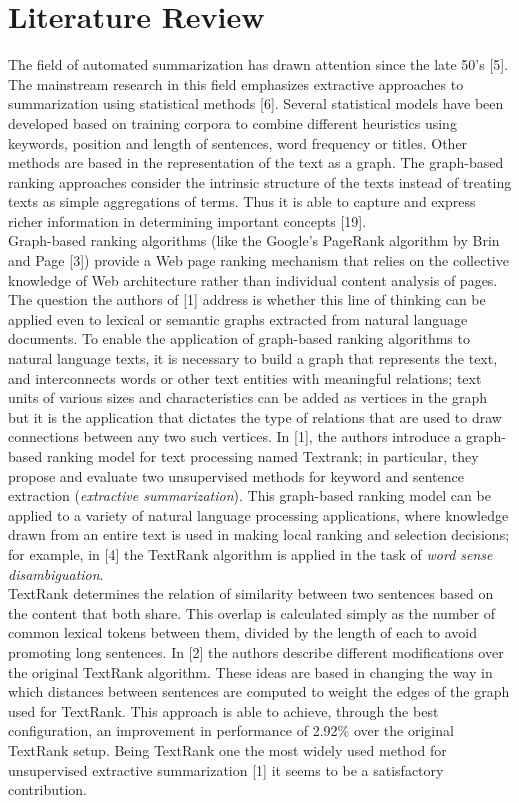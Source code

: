 \documentclass[twoside,twocolumn]{article}
\begin{document}
\section{Literature Review}
The field of automated summarization has drawn attention since the late 50's [5]. The mainstream research in this field emphasizes extractive approaches to summarization using statistical methods [6]. Several statistical models have been developed based on training corpora to combine different heuristics using keywords, position and length of sentences, word frequency or titles. Other methods are based in the representation of the text as a graph. The graph-based ranking approaches consider the intrinsic structure of the texts instead of treating texts as simple aggregations of terms. Thus it is able to capture and express richer information in determining important concepts [19].\\
Graph-based ranking algorithms (like the Google's PageRank algorithm by Brin and Page [3]) provide a Web page ranking mechanism that relies on the collective knowledge of Web architecture rather than individual content analysis of pages. The question the authors of [1] address is whether this line of thinking can be applied even to lexical or semantic graphs extracted from natural language documents. To enable the application of graph-based ranking algorithms to natural language texts, it is necessary to build a graph that represents the text, and interconnects words or other text entities with meaningful relations; text units of various sizes and characteristics can be added as vertices in the graph but it is the application that dictates the type of relations that are used to draw connections between any two such vertices. In [1], the authors introduce a graph-based ranking model for text processing named Textrank; in particular, they propose and evaluate two unsupervised methods for keyword and sentence extraction (\textit{extractive summarization}). This graph-based ranking model can be applied to a variety of natural language processing applications, where knowledge drawn from an entire text is used in making local ranking and selection decisions; for example, in [4] the TextRank algorithm is applied in the task of \textit{word sense disambiguation}. \\
TextRank determines the relation of similarity between two sentences based on the content that both share. This overlap is calculated simply as the number of common lexical tokens between them, divided by the length of each to avoid promoting long sentences. In [2] the authors describe different modifications over the original TextRank algorithm. These ideas are based in changing the way in which distances between sentences are computed to weight the edges of the graph used for TextRank. This approach is able to achieve, through the best configuration, an improvement in performance of 2.92\% over the original TextRank setup. Being TextRank one the most widely used method for unsupervised extractive summarization [1] it seems to be a satisfactory contribution.
\end{document}
